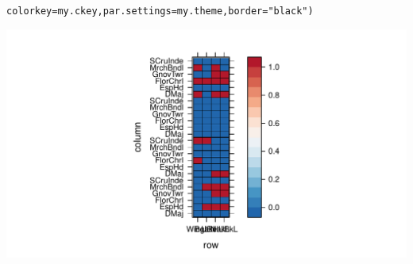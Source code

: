 \documentclass[12pt]{article}\usepackage[]{graphicx}\usepackage[]{color}
\makeatletter
\def\maxwidth{ %
  \ifdim\Gin@nat@width>\linewidth
    \linewidth
  \else
    \Gin@nat@width
  \fi
}
\newcommand{\hlstr}[1]{\textcolor[rgb]{0.192,0.494,0.8}{#1}}%
\newcommand{\hlstd}[1]{\textcolor[rgb]{0.345,0.345,0.345}{#1}}%
\newcommand{\hlkwc}[1]{\textcolor[rgb]{0.333,0.667,0.333}{#1}}%
\newenvironment{kframe}{%
 \def\at@end@of@kframe{}%
 \ifinner\ifhmode%
  \def\at@end@of@kframe{\end{minipage}}%
  \begin{minipage}{\columnwidth}%
 \fi\fi%
 \def\FrameCommand##1{\hskip\@totalleftmargin \hskip-\fboxsep
 \colorbox{shadecolor}{##1}\hskip-\fboxsep
     \hskip-\linewidth \hskip-\@totalleftmargin \hskip\columnwidth}%
 \MakeFramed {\advance\hsize-\width
   \@totalleftmargin\z@ \linewidth\hsize
   \@setminipage}}%
 {\par\unskip\endMakeFramed%
 \at@end@of@kframe}
\newenvironment{knitrout}{}{} %
\makeatother
\begin{document}
\begin{knitrout}
\begin{kframe}
\begin{alltt}
     \hlkwc{colorkey} \hlstd{= my.ckey,} \hlkwc{par.settings} \hlstd{= my.theme,}\hlkwc{border} \hlstd{=} \hlstr{"black"}\hlstd{)}
\end{alltt}
\end{kframe}
\includegraphics[width=\maxwidth]{figure/unnamed-chunk-66-2} 

\end{knitrout}
\end{document}
